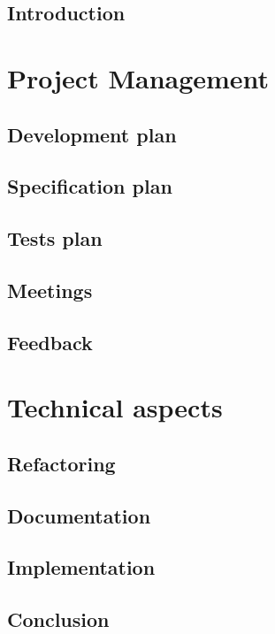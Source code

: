 \documentclass{rapport_log}
\begin{document}

\tableofcontents
	\chapter*{Introduction}
		
\part{Project Management}
	\chapter{Development plan}
		
	\chapter{Specification plan}
		
	\chapter{Tests plan}
		
	\chapter{Meetings}
		
	\chapter{Feedback}
		
\part{Technical aspects}
	\chapter{Refactoring}
			
	\chapter{Documentation}
		
	\chapter{Implementation}
		
	\chapter*{Conclusion}
		
\end{document}
